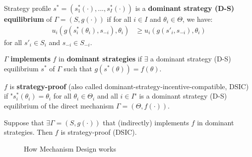 \documentclass[11pt]{elegantbook}
\begin{document}
\begin{definition}
    \normalfont
    Strategy profile $s^*=(s_1^*(\cdot),...,s_I^*(\cdot))$ is a \textbf{dominant strategy (D-S) equilibrium} of $\Gamma=(S,g(\cdot))$ if for all $i\in I$ and $\theta_i\in \Theta$, we have:
    \begin{equation}
        \begin{aligned}
            u_i(g(s_i^*(\theta_i),s_{-i}),\theta_i)&\geq u_i(g(s'_i,s_{-i}),\theta_i)
        \end{aligned}
        \nonumber
    \end{equation}
    for all $s'_i\in S_i$ and $s_{-i}\in S_{-i}$.
\end{definition}

\begin{definition}
    \normalfont
    $\Gamma$ \textbf{implements} $f$ in \textbf{dominant strategies} if $\exists$ a dominant strategy (D-S) equilibrium $s^*$ of $\Gamma$ such that $g(s^*(\theta))=f(\theta)$.
\end{definition}

\begin{definition}
    \normalfont
    $f$ is \textbf{strategy-proof} (also called dominant-strategy-incentive-compatible, DSIC) if "$s^*_i(\theta_i)=\theta_i$ for all $\theta_i\in\Theta_i$ and all $i\in I$" is a dominant strategy (D-S) equilibrium of the direct mechanism $\Gamma=(\Theta,f(\cdot))$.
\end{definition}

\begin{theorem}
    Suppose that $\exists \Gamma=(S,g(\cdot))$ that (indirectly) implements $f$ in dominant strategies. Then $f$ is strategy-proof (DSIC).
\end{theorem}

\begin{center}\begin{figure}[htbp]
    \centering
    \caption{How Mechanism Design works}
    \label{}
\end{figure}\end{center}
\end{document}

